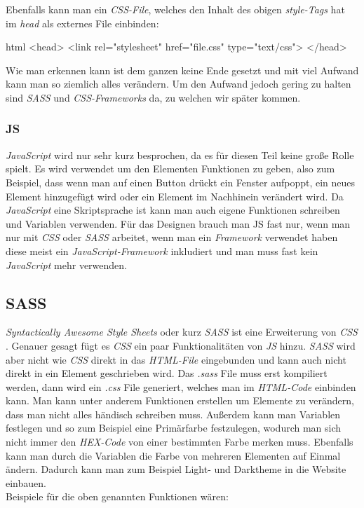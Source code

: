 		Ebenfalls kann man ein \textit{CSS-File}, welches den Inhalt des obigen \textit{style-Tags} hat im \textit{head} als externes File einbinden:
		\begin{code}{html}
			<head>
				<link rel="stylesheet" href="file.css" type="text/css">
			</head>
		\end{code}
		Wie man erkennen kann ist dem ganzen keine Ende gesetzt und mit viel Aufwand kann man so ziemlich alles verändern. Um den Aufwand jedoch gering zu halten sind \textit{SASS} und \textit{CSS-Frameworks} da, zu welchen wir später kommen.
		\subsubsection{JS}
		\textit{JavaScript} wird nur sehr kurz besprochen, da es für diesen Teil keine große Rolle spielt. Es wird verwendet um den Elementen Funktionen zu geben, also zum Beispiel, dass wenn man auf einen Button drückt ein Fenster aufpoppt, ein neues Element hinzugefügt wird oder ein Element im Nachhinein verändert wird. Da \textit{JavaScript} eine Skriptsprache ist kann man auch eigene Funktionen schreiben und Variablen verwenden. Für das Designen brauch man JS fast nur, wenn man nur mit \textit{CSS} oder \textit{SASS} arbeitet, wenn man ein \textit{Framework} verwendet haben diese meist ein \textit{JavaScript-Framework} inkludiert und man muss fast kein \textit{JavaScript} mehr verwenden.
	\subsection{SASS}
	\textit{Syntactically Awesome Style Sheets} oder kurz \textit{SASS} ist eine Erweiterung von \textit{CSS} \cite{jump-start-sass}. Genauer gesagt fügt es \textit{CSS} ein paar Funktionalitäten von \textit{JS} hinzu. \textit{SASS} wird aber nicht wie \textit{CSS} direkt in das \textit{HTML-File} eingebunden und kann auch nicht direkt in ein Element geschrieben wird. Das \textit{.sass} File muss erst kompiliert werden, dann wird ein \textit{.css} File generiert, welches man im \textit{HTML-Code} einbinden kann. Man kann unter anderem Funktionen erstellen um Elemente zu verändern, dass man nicht alles händisch schreiben muss. Außerdem kann man Variablen festlegen und so zum Beispiel eine Primärfarbe festzulegen, wodurch man sich nicht immer den \textit{HEX-Code} von einer bestimmten Farbe merken muss. Ebenfalls kann man durch die Variablen die Farbe von mehreren Elementen auf Einmal ändern. Dadurch kann man zum Beispiel Light- und Darktheme in die Website einbauen.\\Beispiele für die oben genannten Funktionen wären:

